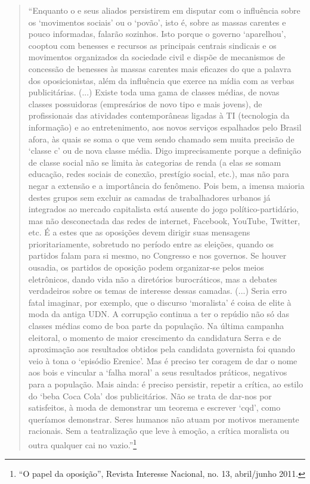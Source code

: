 \begin{quote}
``Enquanto o  e seus aliados persistirem em disputar com o 
influência sobre os `movimentos sociais' ou o `povão', isto é, sobre as
massas carentes e pouco informadas, falarão sozinhos. Isto porque o
governo `aparelhou', cooptou com benesses e recursos as principais
centrais sindicais e os movimentos organizados da sociedade civil e
dispõe de mecanismos de concessão de benesses às massas carentes mais
eficazes do que a palavra dos oposicionistas, além da influência que
exerce na mídia com as verbas publicitárias. (...) Existe toda uma gama
de classes médias, de novas classes possuidoras (empresários de novo
tipo e mais jovens), de profissionais das atividades contemporâneas
ligadas à TI (tecnologia da informação) e ao entretenimento, aos novos
serviços espalhados pelo Brasil afora, às quais se soma o que vem sendo
chamado sem muita precisão de `classe c' ou de nova classe média. Digo
imprecisamente porque a definição de classe social não se limita às
categorias de renda (a elas se somam educação, redes sociais de conexão,
prestígio social, etc.), mas não para negar a extensão e a importância
do fenômeno. Pois bem, a imensa maioria destes grupos sem excluir as
camadas de trabalhadores urbanos já integrados ao mercado capitalista
está ausente do jogo político-partidário, mas não desconectada das redes
de internet, Facebook, YouTube, Twitter, etc. É a estes que as oposições
devem dirigir suas mensagens prioritariamente, sobretudo no período
entre as eleições, quando os partidos falam para si mesmo, no Congresso
e nos governos. Se houver ousadia, os partidos de oposição podem
organizar-se pelos meios eletrônicos, dando vida não a diretórios
burocráticos, mas a debates verdadeiros sobre os temas de interesse
dessas camadas. (...) Seria erro fatal imaginar, por exemplo, que o
discurso `moralista' é coisa de elite à moda da antiga UDN. A corrupção
continua a ter o repúdio não só das classes médias como de boa parte da
população. Na última campanha eleitoral, o momento de maior crescimento
da candidatura Serra e de aproximação aos resultados obtidos pela
candidata governista foi quando veio à tona o `episódio Erenice'. Mas é
preciso ter coragem de dar o nome aos bois e vincular a `falha moral' a
seus resultados práticos, negativos para a população. Mais ainda: é
preciso persistir, repetir a crítica, ao estilo do `beba Coca Cola' dos
publicitários. Não se trata de dar-nos por satisfeitos, à moda de
demonstrar um teorema e escrever `cqd', como queríamos demonstrar. Seres
humanos não atuam por motivos meramente racionais. Sem a teatralização
que leve à emoção, a crítica moralista ou outra qualquer cai no
vazio.''\footnote{``O papel da oposição'', Revista Interesse Nacional,
  no. 13, abril/junho 2011.}
\end{quote}

